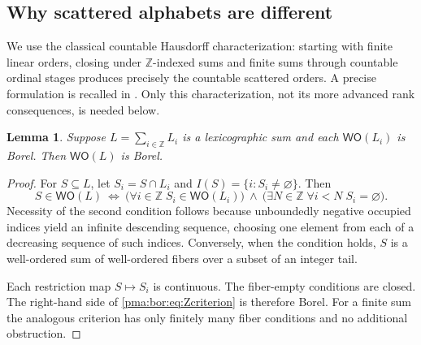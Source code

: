\documentclass[11pt]{article}
\numberwithin{equation}{section}
\newtheorem{lemma}[lemma]{Lemma}
\theoremstyle{definition}
\theoremstyle{remark}
\newcommand{\Z}{\mathbb Z}
\newcommand{\WO}{\mathsf{WO}}
\begin{document}
\subsection{Why scattered alphabets are different}

We use the classical countable Hausdorff characterization: starting with
finite linear orders, closing under $\Z$-indexed sums and finite sums through
countable ordinal stages produces precisely the countable scattered orders.
A precise formulation is recalled in \cite[Definition 1]{AlvirRossegger}.
Only this characterization, not its more advanced rank consequences, is
needed below.

\begin{lemma}
\label{pma:bor:lem:Zsum}
Suppose $L=\sum_{i\in\Z} L_i$ is a lexicographic sum and each
$\WO(L_i)$ is Borel. Then $\WO(L)$ is Borel.
\end{lemma}
\begin{proof}
For $S\subseteq L$, let $S_i=S\cap L_i$ and
$I(S)=\{i:S_i\ne\varnothing\}$. Then
\begin{equation}
\label{pma:bor:eq:Zcriterion}
 S\in\WO(L)
 \ \Longleftrightarrow\
 \bigl(\forall i\in\Z\;S_i\in\WO(L_i)\bigr)
 \ \wedge\
 \bigl(\exists N\in\Z\;\forall i<N\;S_i=\varnothing\bigr).
\end{equation}
Necessity of the second condition follows because unboundedly negative occupied
indices yield an infinite descending sequence, choosing one element from each
of a decreasing sequence of such indices. Conversely, when the condition
holds, $S$ is a well-ordered sum of well-ordered fibers over a subset of an
integer tail.

Each restriction map $S\mapsto S_i$ is continuous. The fiber-empty conditions
are closed. The right-hand side of \eqref{pma:bor:eq:Zcriterion} is therefore Borel.
For a finite sum the analogous criterion has only finitely many fiber
conditions and no additional obstruction.
\end{proof}
\end{document}
